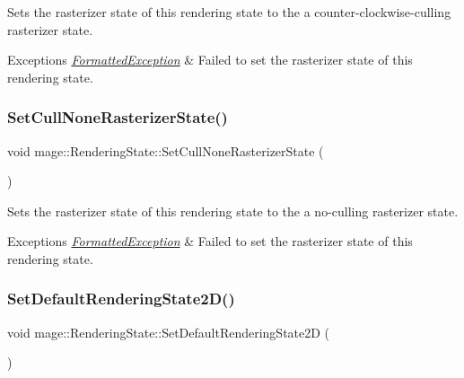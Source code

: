 Sets the rasterizer state of this rendering state to the a counter-\/clockwise-\/culling rasterizer state.


\begin{DoxyExceptions}{Exceptions}
{\em \hyperlink{structmage_1_1_formatted_exception}{Formatted\+Exception}} & Failed to set the rasterizer state of this rendering state. \\
\hline
\end{DoxyExceptions}
\hypertarget{structmage_1_1_rendering_state_a4841e36e7be34f949da1d4088f217a1a}{}\label{structmage_1_1_rendering_state_a4841e36e7be34f949da1d4088f217a1a} 
\subsubsection{\texorpdfstring{Set\+Cull\+None\+Rasterizer\+State()}{SetCullNoneRasterizerState()}}
{\footnotesize\ttfamily void mage\+::\+Rendering\+State\+::\+Set\+Cull\+None\+Rasterizer\+State (\begin{DoxyParamCaption}{ }\end{DoxyParamCaption})}

Sets the rasterizer state of this rendering state to the a no-\/culling rasterizer state.


\begin{DoxyExceptions}{Exceptions}
{\em \hyperlink{structmage_1_1_formatted_exception}{Formatted\+Exception}} & Failed to set the rasterizer state of this rendering state. \\
\hline
\end{DoxyExceptions}
\hypertarget{structmage_1_1_rendering_state_aa8279c1177941c8f14502fc9c7296655}{}\label{structmage_1_1_rendering_state_aa8279c1177941c8f14502fc9c7296655} 
\subsubsection{\texorpdfstring{Set\+Default\+Rendering\+State2\+D()}{SetDefaultRenderingState2D()}}
{\footnotesize\ttfamily void mage\+::\+Rendering\+State\+::\+Set\+Default\+Rendering\+State2D (\begin{DoxyParamCaption}{ }\end{DoxyParamCaption})}

